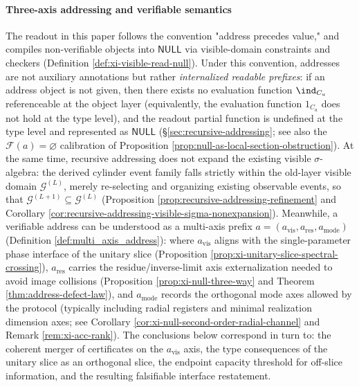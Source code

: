 \paragraph{Three-axis addressing and verifiable semantics}
The readout in this paper follows the convention "address precedes value," and compiles non-verifiable objects into \(\mathsf{NULL}\) via visible-domain constraints and checkers (Definition \ref{def:xi-visible-read-null}).
Under this convention, addresses are not auxiliary annotations but rather \emph{internalized readable prefixes}: if an address object is not given, then there exists no evaluation function \(\ind_{C_a}\) referenceable at the object layer (equivalently, the evaluation function \(1_{C_a}\) does not hold at the type level), and the readout partial function is undefined at the type level and represented as \(\mathsf{NULL}\) (\S\ref{sec:recursive-addressing}; see also the \(\mathscr{F}(a)=\varnothing\) calibration of Proposition \ref{prop:null-as-local-section-obstruction}).
At the same time, recursive addressing does not expand the existing visible \(\sigma\)-algebra: the derived cylinder event family falls strictly within the old-layer visible domain \(\mathcal{G}^{(L)}\), merely re-selecting and organizing existing observable events, so that \(\mathcal{G}^{(L+1)}\subseteq \mathcal{G}^{(L)}\) (Proposition \ref{prop:recursive-addressing-refinement} and Corollary \ref{cor:recursive-addressing-visible-sigma-nonexpansion}).
Meanwhile, a verifiable address can be understood as a multi-axis prefix
\(
a=(a_{\mathrm{vis}},a_{\mathrm{res}},a_{\mathrm{mode}})
\)
(Definition \ref{def:multi_axis_address}):
where \(a_{\mathrm{vis}}\) aligns with the single-parameter phase interface of the unitary slice (Proposition \ref{prop:xi-unitary-slice-spectral-crossing}),
\(a_{\mathrm{res}}\) carries the residue/inverse-limit axis externalization needed to avoid image collisions (Proposition \ref{prop:xi-null-three-way} and Theorem \ref{thm:address-defect-law}),
and \(a_{\mathrm{mode}}\) records the orthogonal mode axes allowed by the protocol (typically including radial registers and minimal realization dimension axes; see Corollary \ref{cor:xi-null-second-order-radial-channel} and Remark \ref{rem:xi-acc-rank}).
The conclusions below correspond in turn to: the coherent merger of certificates on the \(a_{\mathrm{vis}}\) axis, the type consequences of the unitary slice as an orthogonal slice, the endpoint capacity threshold for off-slice information, and the resulting falsifiable interface restatement.

